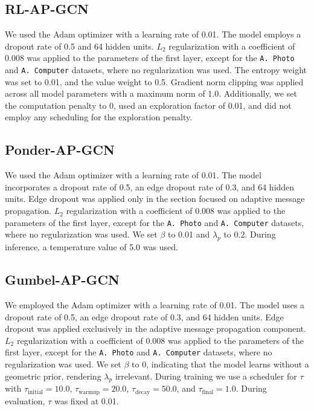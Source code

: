 \documentclass{gdl}
\begin{document}
\subsection{RL-AP-GCN}
\label{lab:hyper-rl-gcn}
We used the Adam optimizer with a learning rate of 0.01. The model employs a dropout rate of 0.5 and 64 hidden units. $L_2$ regularization with a coefficient of 0.008 was applied to the parameters of the first layer, except for the \texttt{A. Photo} and \texttt{A. Computer} datasets, where no regularization was used. The entropy weight was set to 0.01, and the value weight to 0.5. Gradient norm clipping was applied across all model parameters with a maximum norm of 1.0. Additionally, we set the computation penalty to 0, used an exploration factor of 0.01, and did not employ any scheduling for the exploration penalty.

\subsection{Ponder-AP-GCN}
\label{lab:hyper-ponder-gcn}
We used the Adam optimizer with a learning rate of 0.01. The model incorporates a dropout rate of 0.5, an edge dropout rate of 0.3, and 64 hidden units. Edge dropout was applied only in the section focused on adaptive message propagation. $L_2$ regularization with a coefficient of 0.008 was applied to the parameters of the first layer, except for the \texttt{A. Photo} and \texttt{A. Computer} datasets, where no regularization was used. We set $\beta$ to 0.01 and $\lambda_p$ to 0.2. During inference, a temperature value of 5.0 was used.

\subsection{Gumbel-AP-GCN}
\label{lab:hyper-gumbel-gcn}
We employed the Adam optimizer with a learning rate of 0.01. The model uses a dropout rate of 0.5, an edge dropout rate of 0.3, and 64 hidden units. Edge dropout was applied exclusively in the adaptive message propagation component. $L_2$ regularization with a coefficient of 0.008 was applied to the parameters of the first layer, except for the \texttt{A. Photo} and \texttt{A. Computer} datasets, where no regularization was used. We set $\beta$ to 0, indicating that the model learns without a geometric prior, rendering $\lambda_p$ irrelevant. During training we use a scheduler for $\tau$ with $\tau_{\text{initial}} = 10.0$, $\tau_{\text{warmup}} = 20.0$, $\tau_{\text{decay}} = 50.0$, and $\tau_{\text{final}} = 1.0$. During evaluation, $\tau$ was fixed at 0.01.
\end{document}
